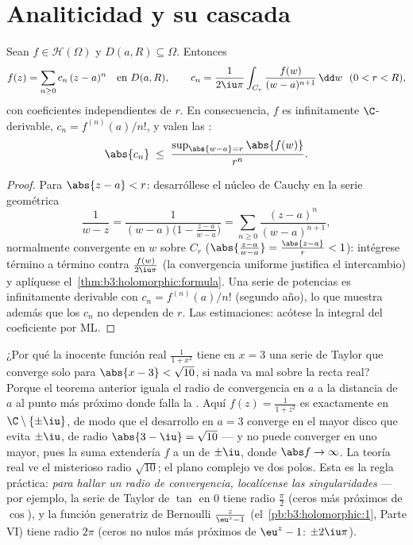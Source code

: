 \section{Analiticidad y su cascada}

\begin{theorem}[Holomorfa $=$ analítica]
\label{thm:b3:holomorphic:analytic}
Sean $f \in \mathcal H(\Omega)$ y $D(a, R) \subseteq \Omega$.
Entonces
\[
f(z) = \sum_{n\geq0}c_n\,(z - a)^n \quad \text{en } D(a, R),
\qquad
c_n = \frac1{2\iu\pi}\int_{C_r}\frac{f(w)}{(w -
a)^{n+1}}\,\dd w \ \ (0 < r < R),
\]
con coeficientes independientes de $r$. En consecuencia, $f$ es
infinitamente $\C$-derivable, $c_n = f^{(n)}(a)/n!$, y valen las
\emph{}:
\[
\abs{c_n} \;\leq\; \frac{\sup_{\abs{w - a} =
r}\abs{f(w)}}{r^{n}} .
\]
\end{theorem}

\begin{proof}
Para $\abs{z - a} < r$: desarróllese el núcleo de Cauchy en la serie
geométrica
\[
\frac1{w - z} = \frac1{(w - a)\bigl(1 - \frac{z - a}{w -
a}\bigr)} = \sum_{n\geq0}\frac{(z - a)^n}{(w - a)^{n+1}},
\]
normalmente convergente en $w$ sobre $C_r$ ($\abs{\frac{z-a}{w-a}} =
\frac{\abs{z-a}}r < 1$): intégrese término a término contra
$\frac{f(w)}{2\iu\pi}$ (la convergencia uniforme justifica el
intercambio) y aplíquese el~\cref{thm:b3:holomorphic:formula}. Una serie
de potencias es infinitamente derivable con $c_n =
f^{(n)}(a)/n!$ (segundo año), lo que muestra además que los $c_n$ no
dependen de $r$. Las estimaciones: acótese la integral del coeficiente
por ML.
\end{proof}

\begin{example}
\label{ex:b3:holomorphic:radius}
¿Por qué la inocente función real $\frac1{1 + x^2}$ tiene en $x = 3$ una
serie de Taylor que converge solo para $\abs{x - 3} <
\sqrt{10}$, si nada va mal sobre la recta real? Porque el teorema
anterior iguala el radio de convergencia en $a$ a la distancia de $a$ al
punto más próximo donde falla la
. Aquí
$f(z) = \frac1{1 + z^2}$ es 
exactamente en $\C\setminus\{\pm\iu\}$, de modo que el desarrollo en
$a = 3$ converge en el mayor disco que evita $\pm\iu$, de radio
$\abs{3 - \iu} = \sqrt{10}$ --- y no puede converger en uno mayor, pues
la suma extendería $f$ 
a un  de $\pm\iu$, donde
$\abs f \to \infty$. La teoría real ve el misterioso radio $\sqrt{10}$;
el plano complejo ve dos polos. Esta es la regla práctica: \emph{para
hallar un radio de convergencia, localícense las singularidades} --- por
ejemplo, la serie de Taylor de $\tan$ en $0$ tiene radio $\frac\pi2$
(ceros más próximos de $\cos$), y la función generatriz de Bernoulli
$\frac z{\eu^z - 1}$ (el~\cref{pb:b3:holomorphic:1}, Parte VI) tiene
radio $2\pi$ (ceros no nulos más próximos de $\eu^z - 1$:
$\pm2\iu\pi$).
\end{example}

